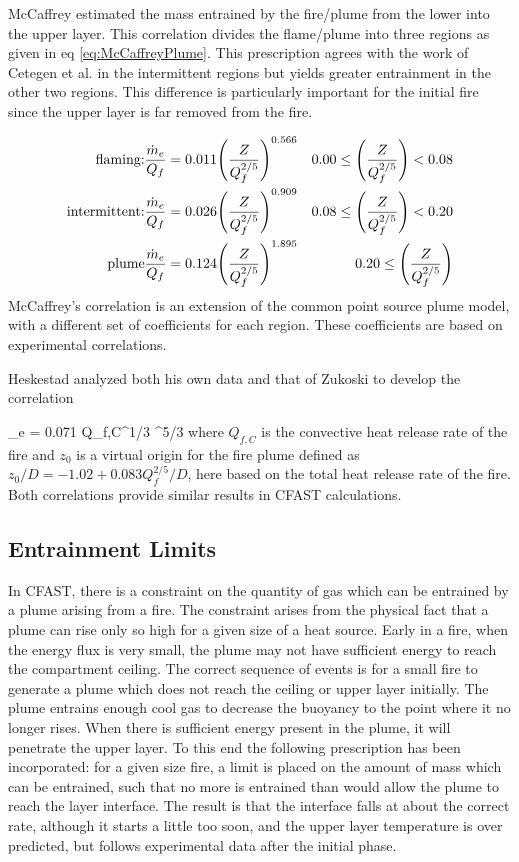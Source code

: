 McCaffrey \cite{McCaffrey:1983} estimated the mass entrained by the fire/plume from the lower into the upper layer. This correlation divides the flame/plume into three regions as given in eq \ref{eq:McCaffreyPlume}.  This prescription agrees with the work of Cetegen et al. \cite{Cetegen:1982, Cetegen:1984} in the intermittent regions but yields greater entrainment in the other two regions.  This difference is particularly important for the initial fire since the upper layer is far removed from the fire.

\begin{eqnarray}
\textnormal{flaming:} & \frac{\dot{m}_e}{Q_f} = 0.011 { \left( {\frac{Z}{Q_f^{2/5}}} \right) }^{0.566} & 0.00 \leq { \left( {\frac{Z}{Q_f^{2/5}}} \right) }<0.08 \nonumber \\
\textnormal{intermittent:} & \frac{\dot{m}_e}{Q_f} = 0.026 { \left( {\frac{Z}{Q_f^{2/5}}} \right) }^{0.909} & 0.08 \leq { \left( {\frac{Z}{Q_f^{2/5}}} \right) }<0.20 \label{eq:McCaffreyPlume} \\
\textnormal{plume} & \frac{\dot{m}_e}{Q_f} = 0.124 { \left( {\frac{Z}{Q_f^{2/5}}} \right) }^{1.895} & 0.20 \leq { \left( {\frac{Z}{Q_f^{2/5}}} \right) } \nonumber
\end{eqnarray}
McCaffrey's correlation is an extension of the common point source plume model, with a different set of coefficients for each region. These coefficients are based on experimental correlations.

Heskestad  analyzed both his own data \cite{Heskestad:1984} and that of Zukoski \cite{Zukoski:1981} to develop the correlation

\be {}_e = 0.071 Q_{f,C}^{1/3} ^{5/3}  \ee
where $Q_{f,C}$ is the convective heat release rate of the fire and $z_0$ is a virtual origin for the fire plume defined as $z_0/D = -1.02 + 0.083 Q_f^{2/5} / D$, here based on the total heat release rate of the fire.  Both correlations provide similar results in CFAST calculations.

\subsection{Entrainment Limits}

In CFAST, there is a constraint on the quantity of gas which can be entrained by a plume arising from a fire.  The constraint arises from the physical fact that a plume can rise only so high for a given size of a heat source.  Early in a fire, when the energy flux is very small, the plume may not have sufficient energy to reach the compartment ceiling. The correct sequence of events is for a small fire to generate a plume which does not reach the ceiling or upper layer initially.  The plume entrains enough cool gas to decrease the buoyancy to the point where it no longer rises. When there is sufficient energy present in the plume, it will penetrate the upper layer.  To this end the following prescription has been incorporated:  for a given size fire, a limit is placed on the amount of mass which can be entrained, such that no more is entrained than would allow the plume to reach the layer interface.  The result is that the interface falls at about the correct rate, although it starts a little too soon, and the upper layer temperature is over predicted, but follows experimental data after the initial phase.

